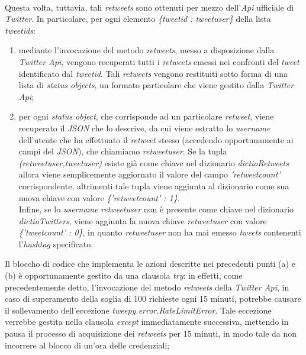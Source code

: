 \begin{enumerate}
\\Questa volta, tuttavia, tali \textit{retweets} sono ottenuti per mezzo dell'\textit{Api} ufficiale di \textit{Twitter}. In particolare, per ogni elemento \textit{\{tweetid : tweetuser\}} della lista \textit{tweetids}:
\begin{enumerate}
\item mediante l'invocazione del metodo \textit{retweets}, messo a disposizione dalla \textit{Twitter Api}, vengono recuperati tutti i \textit{retweets} emessi nei confronti del \textit{tweet} identificato dal \textit{tweetid}. Tali \textit{retweets} vengono restituiti sotto forma di una lista di \textit{status objects}, un formato particolare che viene gestito dalla \textit{Twitter Api};
\item per ogni \textit{status object}, che corrisponde ad un particolare \textit{retweet}, viene recuperato il \textit{JSON} che lo descrive, da cui viene estratto lo \textit{username} dell'utente che ha effettuato il \textit{retweet} stesso (accedendo opportunamente ai campi del \textit{JSON}), che chiamiamo \textit{retweetuser}. Se la tupla \textit{(retweetuser,tweetuser)} esiste già come chiave nel dizionario \textit{dictioRetweets} allora viene semplicemente aggiornato il valore del campo \textit{'retweetcount'} corrispondente, altrimenti tale tupla viene aggiunta al dizionario come sua nuova chiave con valore \textit{\{'retweetcount' : 1\}}. 
\\Infine, se lo \textit{username} \textit{retweetuser} non è presente come chiave nel dizionario \textit{dictioTwitters}, viene aggiunta la nuova chiave \textit{retweetuser} con valore \textit{\{'tweetcount' : 0\}}, in quanto \textit{retweetuser} non ha mai emesso \textit{tweets} contenenti l'\textit{hashtag} specificato.
\end{enumerate}
Il bloccho di codice che implementa le azioni descritte nei precedenti punti (a) e (b) è opportunamente gestito da una clausola \textit{try}: in effetti, come precedentemente detto, l'invocazione del metodo \textit{retweets} della \textit{Twitter Api}, in caso di superamento della soglia di 100 richieste ogni 15 minuti, potrebbe causare il sollevamento dell'eccezione \textit{tweepy.error.RateLimitError}. Tale eccezione verrebbe gestita nella clausola \textit{except} immediatamente successiva, mettendo in pausa il processo di acquisizione dei \textit{retweets} per 15 minuti, in modo tale da non incorrere al blocco di un'ora delle credenziali;

\end{enumerate}
